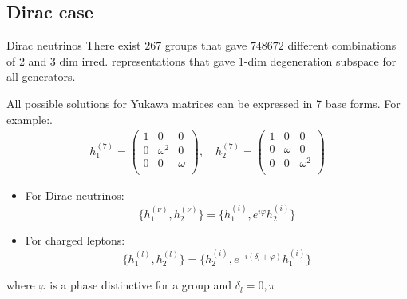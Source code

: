 \documentclass{beamer}
\begin{document}
\subsection{Dirac case}
\begin{frame}{Dirac neutrinos}
There exist \alert{$267$ groups} that gave $748672$ different combinations of 2 and 3 dim irred. representations that gave \alert{ 1-dim degeneration subspace for all generators}. 

All possible solutions for Yukawa matrices can be expressed in 7 base forms. For example:.
\begin{eqnarray}
\label{OmegaR7}
h_{1}^{(7)} = \left(
\begin{array}{ccc}
  1 & 0 & 0 \\
  0 & \omega^{2} & 0 \\
  0 & 0 & \omega \\
\end{array}%
\right), \quad
h_{2}^{(7)} = \left(%
\begin{array}{ccc}
   1 & 0 & 0 \\
  0 & \omega & 0 \\
  0 & 0 & \omega^{2} \\
\end{array}%
\right)
\end{eqnarray}
\end{frame}

\begin{frame}
\begin{itemize}
\item For Dirac neutrinos:
$$\{h_1^{(\nu)},h_2^{(\nu)}\}= \{h_1^{(i)},e^{i\varphi}h_2^{(i)} \}$$
\item For charged leptons:
 $$\lbrace h_{1}^{(l)}, h_{2}^{(l)}\rbrace = \lbrace h_{2}^{(i)}, e^{-i(\delta_{l} +\varphi)} h_{1}^{(i)}\rbrace$$
\end{itemize}
where $\varphi$ is a phase distinctive for a group and $\delta_{l}=0,\pi$

\end{frame}
\end{document}
